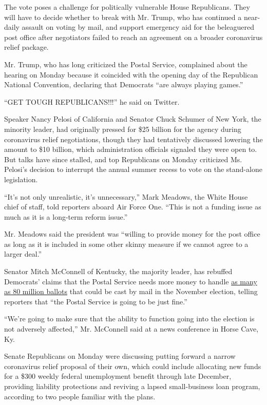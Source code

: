 The vote poses a challenge for politically vulnerable House Republicans.
They will have to decide whether to break with Mr. Trump, who has
continued a near-daily assault on voting by mail, and support emergency
aid for the beleaguered post office after negotiators failed to reach an
agreement on a broader coronavirus relief package.

Mr. Trump, who has long criticized the Postal Service, complained about
the hearing on Monday because it coincided with the opening day of the
Republican National Convention, declaring that Democrats ``are always
playing games.''

``GET TOUGH REPUBLICANS!!!'' he said on Twitter.

Speaker Nancy Pelosi of California and Senator Chuck Schumer of New
York, the minority leader, had originally pressed for \$25 billion for
the agency during coronavirus relief negotiations, though they had
tentatively discussed lowering the amount to \$10 billion, which
administration officials signaled they were open to. But talks have
since stalled, and top Republicans on Monday criticized Ms. Pelosi's
decision to interrupt the annual summer recess to vote on the
stand-alone legislation.

``It's not only unrealistic, it's unnecessary,'' Mark Meadows, the White
House chief of staff, told reporters aboard Air Force One. ``This is not
a funding issue as much as it is a long-term reform issue.''

Mr. Meadows said the president was ``willing to provide money for the
post office as long as it is included in some other skinny measure if we
cannot agree to a larger deal.''

Senator Mitch McConnell of Kentucky, the majority leader, has rebuffed
Democrats' claims that the Postal Service needs more money to handle
\href{https://slack-redir.net/link?url=https\%3A\%2F\%2Fwww.nytimes3xbfgragh.onion\%2Finteractive\%2F2020\%2F08\%2F11\%2Fus\%2Fpolitics\%2Fvote-by-mail-us-states.html}{as
many as 80 million ballots} that could be cast by mail in the November
election, telling reporters that ``the Postal Service is going to be
just fine.''

``We're going to make sure that the ability to function going into the
election is not adversely affected,'' Mr. McConnell said at a news
conference in Horse Cave, Ky.

Senate Republicans on Monday were discussing putting forward a narrow
coronavirus relief proposal of their own, which could include allocating
new funds for a \$300 weekly federal unemployment benefit through late
December, providing liability protections and reviving a lapsed
small-business loan program, according to two people familiar with the
plans.


